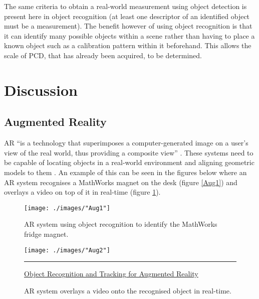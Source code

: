 The same criteria to obtain a real-world measurement using object detection is present here in object recognition (at least one descriptor of an identified object must be a measurement). The benefit however of using object recognition is that it can identify many possible objects within a scene rather than having to place a known object such as a calibration pattern within it beforehand. This allows the scale of PCD, that has already been acquired, to be determined. %

\section{Discussion\label{LitRevDiscussion}}

\subsection{Augmented Reality\label{ARChap}}
AR ``is a technology that superimposes a computer-generated image on a user's view of the real world, thus providing a composite view'' \citep{sadiku_signals_2015}. These systems need to be capable of locating objects in a real-world environment and aligning geometric models to them \citep{whitaker_object_1995}. An example of this can be seen in the figures below where an AR system recognises a MathWorks magnet on the desk (figure \ref{Aug1}) and overlays a video on top of it in real-time (figure \ref{Aug2}).
\vspace{10mm}
\begin{figure}[!h]
	\centering
	\begin{minipage}{.45\linewidth}
		\texttt{[image: ./images/"Aug1"]}
		\caption[AR system using object recognition]{AR system using object recognition to identify the MathWorks fridge magnet. 
		\label{Aug1}}
	\end{minipage}
	\hspace{.05\linewidth}
	\begin{minipage}{.45\linewidth}
		\texttt{[image: ./images/"Aug2"]}
		\caption[AR system overlays a video on an object in real-time]{AR system overlays a video onto the recognised object in real-time.
		\label{Aug2}}
	\end{minipage}
	\rule[0.5em]{38em}{0.5pt}
	\href{http://www.mathworks.com/videos/object-recognition-and-tracking-for-augmented-reality-90546.html}{Object Recognition and Tracking for Augmented Reality}
\end{figure}

